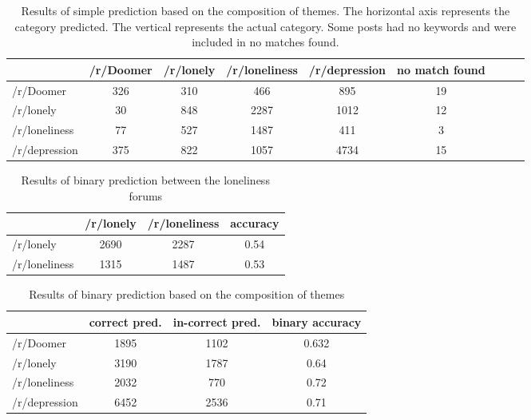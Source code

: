 \documentclass[../report.tex]{subfiles}
\begin{document}
\begin{table*}[ht]
    \centering
   \begin{tabular}{| l | c | c |c | c | c | c | c | c |}
    \toprule
    {} & /r/Doomer & /r/lonely & /r/loneliness & /r/depression & no match found \\ 
    \midrule
 /r/Doomer & 326 & 310 & 466 & 895 & 19 \\ 
 /r/lonely & 30 & 848 & 2287 & 1012 & 12 \\ 
/r/loneliness & 77 & 527 & 1487 & 411 & 3 \\
/r/depression & 375 & 822 & 1057 & 4734 & 15 \\

    \bottomrule
   \end{tabular} 

   \caption{Results of simple prediction based on the composition of themes. The horizontal axis represents the category predicted. The vertical represents the actual category. Some posts had no keywords and were included in no matches found.}
   \label{tab:pred_results}
\end{table*}

\begin{table}[ht]
    \centering
   \begin{tabular}{| l | c | c |c |}
    \toprule
    {} & /r/lonely & /r/loneliness & accuracy \\ 
    \midrule
/r/lonely & 2690 & 2287 & 0.54 \\
/r/loneliness & 1315 & 1487 & 0.53 \\
    \bottomrule
   \end{tabular}

   \caption{Results of binary prediction between the loneliness forums}
   \label{tab:loneliness_pred_results}
\end{table}

\begin{table}[H]
    \centering
   \begin{tabular}{| l | c | c |c |}
    \toprule
    {} & \multicolumn{1}{p{1cm}|}{correct pred.} & \multicolumn{1}{p{1cm}|}{in-correct pred.} & \multicolumn{1}{p{1cm}|}{binary accuracy} \\
    \midrule
 /r/Doomer & 1895 & 1102 & 0.632\\ 
 /r/lonely & 3190 & 1787 & 0.64\\ 
/r/loneliness & 2032 & 770 & 0.72\\
/r/depression & 6452 & 2536 & 0.71 \\
    \bottomrule
   \end{tabular}

   \caption{Results of binary prediction based on the composition of themes}
   \label{tab:binary_pred_results}
\end{table}
\end{document}
